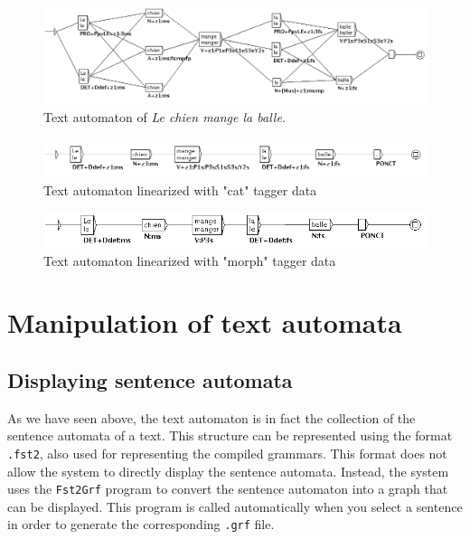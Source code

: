 \begin{figure}[!ht]
\begin{center}
\includegraphics[width=16cm]{resources/img/fig7-linearize2.png}
\caption{Text automaton of \textit{Le chien mange la balle.}\label{fig7-linearize2}}
\end{center}
\end{figure}

\begin{figure}[!ht]
\begin{center}
\includegraphics[width=16cm]{resources/img/fig7-linearize3.png}
\caption{Text automaton linearized with "cat" tagger data\label{fig7-linearize3}}
\end{center}
\end{figure}

\begin{figure}[!ht]
\begin{center}
\includegraphics[width=16cm]{resources/img/fig7-linearize4.png}
\caption{Text automaton linearized with "morph" tagger data\label{fig7-linearize4}}
\end{center}
\end{figure}
 


\section{Manipulation of text automata}

\subsection{Displaying sentence automata}
\label{section-displaying-sentence-automata}
As we have seen above, the text automaton is in fact the collection of the
sentence automata of a text. This structure can be represented using the format
\verb+.fst2+, also used for representing the compiled
grammars. This format does not allow the system to
directly display the sentence automata. Instead, the system uses the
\verb+Fst2Grf+ program to convert the sentence automaton into a graph that can
be displayed. This program is called automatically when you select a sentence  in
order to generate the corresponding \verb+.grf+ file.

